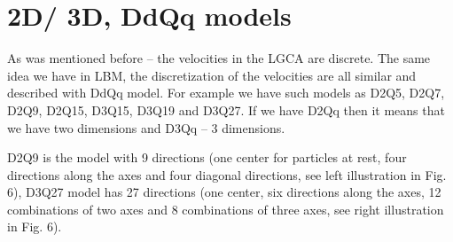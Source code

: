 
\section{2D/ 3D, DdQq models}

As was mentioned before – the velocities in the LGCA are discrete. The same idea we have in LBM, the discretization of the velocities are all similar and described with DdQq model. For example we have such models as D2Q5, D2Q7, D2Q9, D2Q15, D3Q15, D3Q19 and D3Q27. If we have D2Qq then it means that we have two dimensions and D3Qq – 3 dimensions.

D2Q9 is the model with 9 directions (one center for particles at rest, four directions along the axes and four diagonal directions, see left illustration in Fig. 6), D3Q27 model has 27 directions (one center, six directions along the axes, 12 combinations of two axes and 8 combinations of three axes, see right illustration in Fig. 6).

